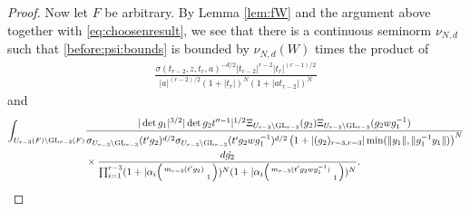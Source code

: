 \documentclass[12pt]{amsart}
\theoremstyle{remark}
\numberwithin{equation}{section}
\newcommand{\GL}{\mathrm{GL}}
\theoremstyle{definition}
\newenvironment{psmatrix}
  {\left(\begin{smallmatrix}}
  {\end{smallmatrix}\right)}
\numberwithin{equation}{subsection}
\newcommand{\norm}[1]{\lVert#1\rVert}
\begin{document}
\begin{proof}
Now let $F$ be arbitrary. By Lemma \ref{lem:fW} and the argument above together with \eqref{eq:choosenresult}, we see that
there is a continuous seminorm $\nu_{N,d}$ such that \eqref{before:psi:bounds} is bounded by $
\nu_{N,d}\left(W \right)$ 
times
the product of 
\begin{align} \label{first:factor1}
\frac{\sigma(t_{r-2},z,t_r,a)^{-d/2}|t_{r-2}|^{r-2}|t_r|^{(r-1)/2}}{|a|^{(r-2)/2}(1+|t_r|)^{N}(1+|at_{r-2}|)^N}
\end{align} 
and
\begin{align*}
\int_{U_{r-3}(F) \backslash \GL_{r-3}(F)}&\frac{|\det g_1|^{3/2}|\det g_2t''^{-1}|^{1/2}\Xi_{U_{r-3} \backslash \GL_{r-3}}(g_2)\Xi_{U_{r-3} \backslash \GL_{r-3}}(g_2wg_1^{-1})}{\sigma_{U_{r-3} \backslash \GL_{r-3}}(t'g_2)^{d/2}\sigma_{U_{r-3} \backslash \GL_{r-3}}(t'g_2wg_1^{-1})^{d/2}\left(1+|(g_2)_{r-3,r-3}|\min(\norm{y_1},\norm{g_1^{-1}y_1})\right)^{N}}\\& \times
  \frac{d\dot{g_2}}{ \prod_{i=1}^{r-3}(1+|\alpha_i\begin{psmatrix} m_{r-3}(t'g_2) & \\ & 1 \end{psmatrix})^{N}(1+|\alpha_i\begin{psmatrix} m_{r-3}(t'g_2wg_1^{-1}) & \\ & 1 \end{psmatrix})^{N}} .
\end{align*}



\end{proof}
\end{document}
